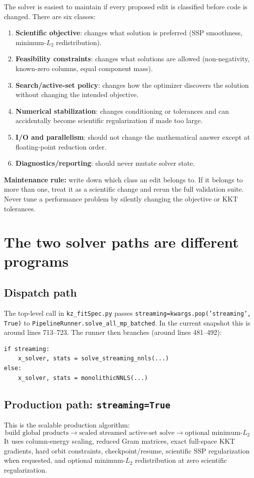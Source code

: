 \documentclass[10pt,a4paper]{article}
\newcommand{\code}[1]{\texttt{#1}}
\newcommand{\file}[1]{\texttt{#1}}
\newenvironment{maintnote}{\begin{leftbar}\small\color{darkgray}}{\end{leftbar}}
\begin{document}
The solver is easiest to maintain if every proposed edit is classified before code is changed. There are six classes:
\begin{enumerate}
\item \textbf{Scientific objective}: changes what solution is preferred (SSP smoothness, minimum-$L_2$ redistribution).
\item \textbf{Feasibility constraints}: changes what solutions are allowed (non-negativity, known-zero columns, equal component mass).
\item \textbf{Search/active-set policy}: changes how the optimizer discovers the solution without changing the intended objective.
\item \textbf{Numerical stabilization}: changes conditioning or tolerances and can accidentally become scientific regularization if made too large.
\item \textbf{I/O and parallelism}: should not change the mathematical answer except at floating-point reduction order.
\item \textbf{Diagnostics/reporting}: should never mutate solver state.
\end{enumerate}

\begin{maintnote}
\textbf{Maintenance rule:} write down which class an edit belongs to. If it belongs to more than one, treat it as a scientific change and rerun the full validation suite. Never tune a performance problem by silently changing the objective or KKT tolerances.
\end{maintnote}

\section{The two solver paths are different programs}
\subsection{Dispatch path}
The top-level call in \file{kz\_fitSpec.py} passes \code{streaming=kwargs.pop('streaming', True)} to \code{PipelineRunner.solve\_all\_mp\_batched}. In the current snapshot this is around lines 713--723. The runner then branches (around lines 481--492):
\begin{lstlisting}
if streaming:
    x_solver, stats = solve_streaming_nnls(...)
else:
    x_solver, stats = monolithicNNLS(...)
\end{lstlisting}

\subsection{Production path: \code{streaming=True}}
This is the scalable production algorithm:
\[
\boxed{\text{build global products} \rightarrow \text{scaled streamed active-set solve} \rightarrow \text{optional minimum-}L_2}
\]
It uses column-energy scaling, reduced Gram matrices, exact full-space KKT gradients, hard orbit constraints, checkpoint/resume, scientific SSP regularization when requested, and optional minimum-$L_2$ redistribution at zero scientific regularization.
\end{document}
